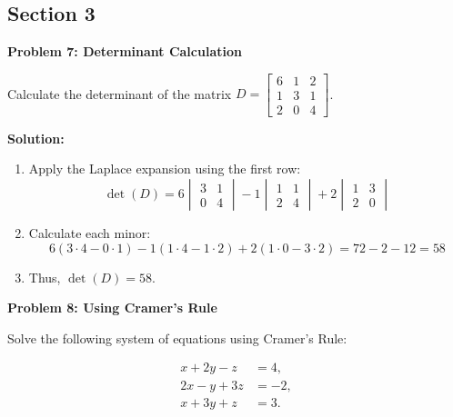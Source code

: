 \documentclass[8pt, a4paper, landscape]{extarticle}
\begin{document}
\begin{multicols*}{3}

  \section*{Section 3}

  \textbf{Problem 7: Determinant Calculation}

  Calculate the determinant of the matrix $D = \begin{bmatrix} 6 & 1 & 2 \\ 1 & 3 & 1 \\ 2 & 0 & 4 \end{bmatrix}$.

  \textbf{Solution:}
  \begin{enumerate}
    \item Apply the Laplace expansion using the first row:
          \[
            \det(D) = 6\begin{vmatrix} 3 & 1 \\ 0 & 4 \end{vmatrix} - 1\begin{vmatrix} 1 & 1 \\ 2 & 4 \end{vmatrix} + 2\begin{vmatrix} 1 & 3 \\ 2 & 0 \end{vmatrix}
          \]
    \item Calculate each minor:
          \[
            6(3 \cdot 4 - 0 \cdot 1) - 1(1 \cdot 4 - 1 \cdot 2) + 2(1 \cdot 0 - 3 \cdot 2) = 72 - 2 - 12 = 58
          \]
    \item Thus, $\det(D) = 58$.
  \end{enumerate}

  \textbf{Problem 8: Using Cramer's Rule}

  Solve the following system of equations using Cramer's Rule:


  \begin{equation}
    \begin{aligned}
      x + 2y - z  & = 4,  \\
      2x - y + 3z & = -2, \\
      x + 3y + z  & = 3.\end{aligned}
  \end{equation}


\end{multicols*}
\end{document}
